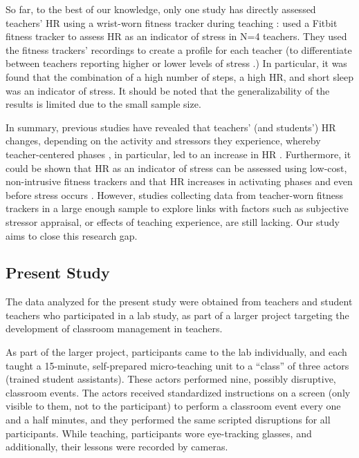 \documentclass[preprint, 3p,
authoryear]{elsarticle} %
\begin{document}
So far, to the best of our knowledge, only one study has directly
assessed teachers' HR using a wrist-worn fitness tracker during teaching
: \citet{runge2020} used a Fitbit fitness tracker to assess HR as an
indicator of stress in N=4 teachers. They used the fitness trackers'
recordings to create a profile for each teacher (to differentiate
between teachers reporting higher or lower levels of stress .) In
particular, it was found that the combination of a high number of steps,
a high HR, and short sleep was an indicator of stress. It should be
noted that the generalizability of the results is limited due to the
small sample size.

In summary, previous studies have revealed that teachers' (and
students') HR changes, depending on the activity and stressors they
experience, whereby teacher-centered phases , in particular, led to an
increase in HR
\citep{sperka1995, scheuch1997psychophysische, donker2018, junker2021}.
Furthermore, it could be shown that HR as an indicator of stress can be
assessed using low-cost, non-intrusive fitness trackers and that HR
increases in activating phases and even before stress occurs
\citep{Darnell2019, chalmers2021}. However, studies collecting data from
teacher-worn fitness trackers in a large enough sample to explore links
with factors such as subjective stressor appraisal, or effects of
teaching experience, are still lacking. Our study aims to close this
research gap.

\subsection{Present Study}\label{present-study}

The data analyzed for the present study were obtained from teachers and
student teachers who participated in a lab study, as part of a larger
project targeting the development of classroom management in teachers.

As part of the larger project, participants came to the lab
individually, and each taught a 15-minute, self-prepared micro-teaching
unit to a ``class'' of three actors (trained student assistants). These
actors performed nine, possibly disruptive, classroom events. The actors
received standardized instructions on a screen (only visible to them,
not to the participant) to perform a classroom event every one and a
half minutes, and they performed the same scripted disruptions for all
participants. While teaching, participants wore eye-tracking glasses,
and additionally, their lessons were recorded by cameras.
\end{document}
